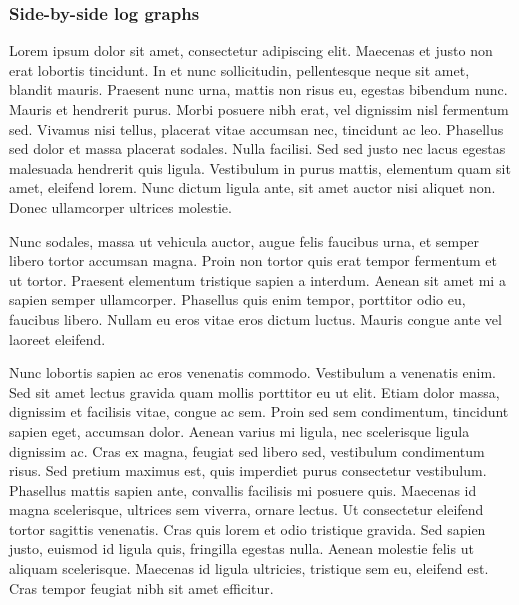 \documentclass[
]{article}
\begin{document}
\hypertarget{side-by-side-log-graphs}{%
\subsubsection{Side-by-side log graphs}\label{side-by-side-log-graphs}}

Lorem ipsum dolor sit amet, consectetur adipiscing elit. Maecenas et
justo non erat lobortis tincidunt. In et nunc sollicitudin, pellentesque
neque sit amet, blandit mauris. Praesent nunc urna, mattis non risus eu,
egestas bibendum nunc. Mauris et hendrerit purus. Morbi posuere nibh
erat, vel dignissim nisl fermentum sed. Vivamus nisi tellus, placerat
vitae accumsan nec, tincidunt ac leo. Phasellus sed dolor et massa
placerat sodales. Nulla facilisi. Sed sed justo nec lacus egestas
malesuada hendrerit quis ligula. Vestibulum in purus mattis, elementum
quam sit amet, eleifend lorem. Nunc dictum ligula ante, sit amet auctor
nisi aliquet non. Donec ullamcorper ultrices molestie.

Nunc sodales, massa ut vehicula auctor, augue felis faucibus urna, et
semper libero tortor accumsan magna. Proin non tortor quis erat tempor
fermentum et ut tortor. Praesent elementum tristique sapien a interdum.
Aenean sit amet mi a sapien semper ullamcorper. Phasellus quis enim
tempor, porttitor odio eu, faucibus libero. Nullam eu eros vitae eros
dictum luctus. Mauris congue ante vel laoreet eleifend.

Nunc lobortis sapien ac eros venenatis commodo. Vestibulum a venenatis
enim. Sed sit amet lectus gravida quam mollis porttitor eu ut elit.
Etiam dolor massa, dignissim et facilisis vitae, congue ac sem. Proin
sed sem condimentum, tincidunt sapien eget, accumsan dolor. Aenean
varius mi ligula, nec scelerisque ligula dignissim ac. Cras ex magna,
feugiat sed libero sed, vestibulum condimentum risus. Sed pretium
maximus est, quis imperdiet purus consectetur vestibulum. Phasellus
mattis sapien ante, convallis facilisis mi posuere quis. Maecenas id
magna scelerisque, ultrices sem viverra, ornare lectus. Ut consectetur
eleifend tortor sagittis venenatis. Cras quis lorem et odio tristique
gravida. Sed sapien justo, euismod id ligula quis, fringilla egestas
nulla. Aenean molestie felis ut aliquam scelerisque. Maecenas id ligula
ultricies, tristique sem eu, eleifend est. Cras tempor feugiat nibh sit
amet efficitur.
\end{document}
